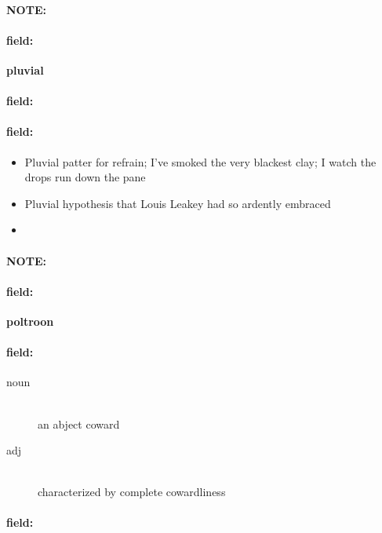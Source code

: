 \documentclass[12pt]{article}
\newenvironment{note}{\paragraph{NOTE:}}{}
\newenvironment{field}{\paragraph{field:}}{}
\begin{document}
\begin{note}
\begin{field}
\textbf{\large pluvial}
\end{field}


\begin{field}
\end{field}

\begin{field}
\begin{itemize}
\item Pluvial patter for refrain; I've smoked the very blackest clay; I watch the drops run down the pane
\item Pluvial hypothesis that Louis Leakey had so ardently embraced
\item 
\end{itemize}
\end{field}
\end{note}
\begin{note}
\begin{field}
\textbf{\large poltroon}
\end{field}


\begin{field}
\begin{description}
\item[noun] \hfill \\ 
an abject coward

\item[adj] \hfill \\ 
characterized by complete cowardliness

\end{description}
\end{field}

\begin{field}
\end{field}
\end{note}
\end{document}
